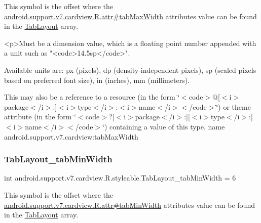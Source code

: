 This symbol is the offset where the \hyperlink{classandroid_1_1support_1_1v7_1_1cardview_1_1R_1_1attr_a62bbe7ecd0c461ba4944a576d2ef8e66}{android.\+support.\+v7.\+cardview.\+R.\+attr\#tab\+Max\+Width} attribute\textquotesingle{}s value can be found in the \hyperlink{classandroid_1_1support_1_1v7_1_1cardview_1_1R_1_1styleable_afa0dc9366603eaec9e38d99273ba8512}{Tab\+Layout} array.

\begin{DoxyVerb}      <p>Must be a dimension value, which is a floating point number appended with a unit such as "<code>14.5sp</code>".
\end{DoxyVerb}
 Available units are\+: px (pixels), dp (density-\/independent pixels), sp (scaled pixels based on preferred font size), in (inches), mm (millimeters). 

This may also be a reference to a resource (in the form \char`\"{}$<$code$>$@\mbox{[}$<$i$>$package$<$/i$>$\+:\mbox{]}$<$i$>$type$<$/i$>$\+:$<$i$>$name$<$/i$>$$<$/code$>$\char`\"{}) or theme attribute (in the form \char`\"{}$<$code$>$?\mbox{[}$<$i$>$package$<$/i$>$\+:\mbox{]}\mbox{[}$<$i$>$type$<$/i$>$\+:\mbox{]}$<$i$>$name$<$/i$>$$<$/code$>$\char`\"{}) containing a value of this type.  name android.\+support.\+v7.\+cardview\+:tab\+Max\+Width \mbox{\label{classandroid_1_1support_1_1v7_1_1cardview_1_1R_1_1styleable_a02d9b59abfd1ddbbe8c4d2e6062f03a5}} 
\subsubsection{\texorpdfstring{Tab\+Layout\+\_\+tab\+Min\+Width}{TabLayout\_tabMinWidth}}
{\footnotesize\ttfamily int android.\+support.\+v7.\+cardview.\+R.\+styleable.\+Tab\+Layout\+\_\+tab\+Min\+Width = 6\hspace{0.3cm}{\ttfamily [static]}}

This symbol is the offset where the \hyperlink{classandroid_1_1support_1_1v7_1_1cardview_1_1R_1_1attr_a03ed2a5363c4bba9d9e149f556990a01}{android.\+support.\+v7.\+cardview.\+R.\+attr\#tab\+Min\+Width} attribute\textquotesingle{}s value can be found in the \hyperlink{classandroid_1_1support_1_1v7_1_1cardview_1_1R_1_1styleable_afa0dc9366603eaec9e38d99273ba8512}{Tab\+Layout} array.


